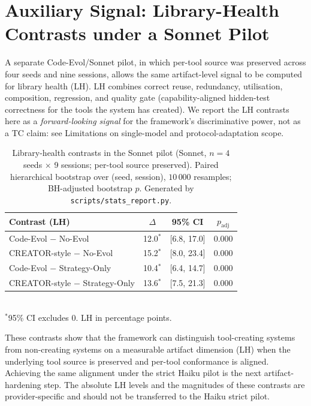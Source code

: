 \documentclass[sigconf,anonymous,review,natbib=false]{acmart}
\begin{document}
\section{Auxiliary Signal: Library-Health Contrasts under a Sonnet Pilot}
\label{app:lh-aux}

A separate Code-Evol/Sonnet pilot, in which per-tool source was
preserved across four seeds and nine sessions, allows the same
artifact-level signal to be computed for library health (LH). LH
combines correct reuse, redundancy, utilisation, composition,
regression, and quality gate (capability-aligned hidden-test
correctness for the tools the system has created). We report the LH
contrasts here as a \emph{forward-looking signal} for the framework's
discriminative power, not as a TC claim: see Limitations on
single-model and protocol-adaptation scope.

\begin{table}[h]
\centering\small
\caption{Library-health contrasts in the Sonnet pilot
(Sonnet, $n{=}4$ seeds $\times$ 9 sessions; per-tool source preserved).
Paired hierarchical bootstrap over (seed, session), $10\,000$ resamples;
BH-adjusted bootstrap $p$. Generated by \texttt{scripts/stats\_report.py}.}
\label{tab:lh_stats_supp}
\begin{tabular}{lccc}
\toprule
\textbf{Contrast (LH)} & \textbf{$\Delta$} & \textbf{95\% CI} & \textbf{$p_{\mathrm{adj}}$} \\
\midrule
Code-Evol $-$ No-Evol           & 12.0$^{*}$ & [6.8, 17.0]  & 0.000 \\
CREATOR-style $-$ No-Evol       & 15.2$^{*}$ & [8.0, 23.4]  & 0.000 \\
Code-Evol $-$ Strategy-Only     & 10.4$^{*}$ & [6.4, 14.7]  & 0.000 \\
CREATOR-style $-$ Strategy-Only & 13.6$^{*}$ & [7.5, 21.3]  & 0.000 \\
\bottomrule
\end{tabular}
\\[2pt]\footnotesize $^{*}$95\% CI excludes 0. LH in percentage points.
\end{table}

These contrasts show that the framework can distinguish
tool-creating systems from non-creating systems on a measurable
artifact dimension (LH) when the underlying tool source is preserved
and per-tool conformance is aligned. Achieving the same alignment
under the strict Haiku pilot is the next artifact-hardening step. The
absolute LH levels and the magnitudes of these contrasts are
provider-specific and should not be transferred to the Haiku strict
pilot.


\end{document}
